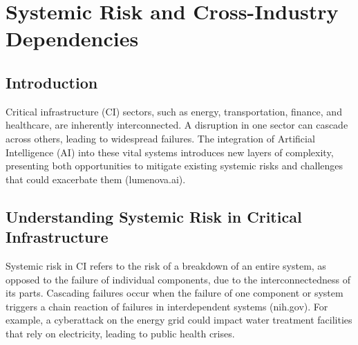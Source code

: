\chapter{Systemic Risk and Cross-Industry Dependencies}
\section{Introduction}
Critical infrastructure (CI) sectors, such as energy, transportation, finance, and healthcare, are inherently interconnected. A disruption in one sector can cascade across others, leading to widespread failures. The integration of Artificial Intelligence (AI) into these vital systems introduces new layers of complexity, presenting both opportunities to mitigate existing systemic risks and challenges that could exacerbate them (lumenova.ai).

\section{Understanding Systemic Risk in Critical Infrastructure}
Systemic risk in CI refers to the risk of a breakdown of an entire system, as opposed to the failure of individual components, due to the interconnectedness of its parts. Cascading failures occur when the failure of one component or system triggers a chain reaction of failures in interdependent systems (nih.gov). For example, a cyberattack on the energy grid could impact water treatment facilities that rely on electricity, leading to public health crises.

